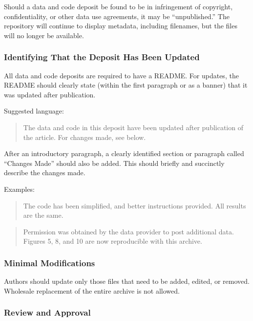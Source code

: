 Should a data and code deposit be found to be in infringement of
copyright, confidentiality, or other data use agreements, it may be
``unpublished.'' The repository will continue to display metadata,
including filenames, but the files will no longer be available.

\subsubsection{Identifying That the Deposit Has Been
Updated}\label{identifying-that-the-deposit-has-been-updated}

All data and code deposits are required to have a README. For updates,
the README should clearly state (within the first paragraph or as a
banner) that it was updated after publication.

Suggested language:

\begin{quote}
The data and code in this deposit have been updated after publication of
the article. For changes made, see below.
\end{quote}

After an introductory paragraph, a clearly identified section or
paragraph called ``Changes Made'' should also be added. This should
briefly and succinctly describe the changes made.

Examples:

\begin{quote}
The code has been simplified, and better instructions provided. All
results are the same.
\end{quote}

\begin{quote}
Permission was obtained by the data provider to post additional data.
Figures 5, 8, and 10 are now reproducible with this archive.
\end{quote}

\subsubsection{Minimal Modifications}\label{minimal-modifications}

Authors should update only those files that need to be added, edited, or
removed. Wholesale replacement of the entire archive is not allowed.

\subsubsection{Review and Approval}\label{review-and-approval}

